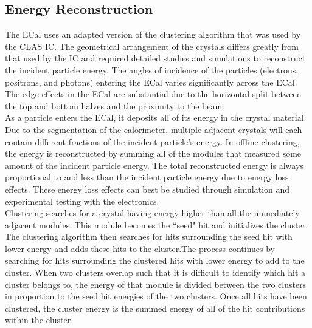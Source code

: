 \subsection{Energy Reconstruction}
The ECal uses an adapted version of the clustering algorithm that was used by the CLAS IC. The geometrical arrangement of the crystals differs greatly from that used by the IC and required detailed studies and simulations to reconstruct the incident particle energy. The angles of incidence of the particles (electrons, positrons, and photons) entering the ECal varies significantly across the ECal. The edge effects in the ECal are substantial due to the horizontal split between the top and bottom halves and  the proximity to the beam. \\
\indent As a particle enters the ECal, it deposits all of its energy in the crystal material. Due to the segmentation of the calorimeter, multiple adjacent crystals will each contain different fractions of the incident particle's energy. In offline clustering, the energy is reconstructed by summing all of the modules that measured some amount of the incident particle energy. The total reconstructed energy is always proportional to and less than the incident particle energy due to energy loss effects. These energy loss effects can best be studied through simulation and experimental testing with the electronics.\\
\indent Clustering searches for a crystal having energy higher than all the immediately adjacent modules. This module becomes the ``seed" hit and initializes the cluster. The clustering algorithm then searches for hits surrounding the seed hit with lower energy and adds these hits to the cluster.The process continues by searching for hits surrounding the clustered hits with lower energy to add to the cluster. When two clusters overlap such that it is difficult to identify which hit a cluster belongs to, the energy of that module is divided between the two clusters in proportion to the seed hit energies of the two clusters.  Once all hits have been clustered, the cluster energy is the summed energy of all of the hit contributions within the cluster. 

